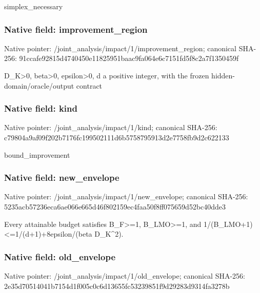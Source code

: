 \documentclass[10pt,a4paper]{article}
\begin{document}
\begingroup\raggedright\sloppy simplex\_\allowbreak{}necessary\par\endgroup

\subsubsection{Native field: improvement\_\allowbreak{}region}
Native pointer: /joint\_\allowbreak{}analysis/impact/1/improvement\_\allowbreak{}region; canonical SHA-256: 91ccafe92815d4740450e11825951baac9fa064e6c7151fd5f8c2a7f1350459f

\begingroup\raggedright\sloppy D\_\allowbreak{}K>0,\allowbreak{} beta>0,\allowbreak{} epsilon>0,\allowbreak{} d a positive integer,\allowbreak{} with the frozen hidden-domain/\allowbreak{}oracle/\allowbreak{}output contract\par\endgroup

\subsubsection{Native field: kind}
Native pointer: /joint\_\allowbreak{}analysis/impact/1/kind; canonical SHA-256: c79804a9af09f202b7176fc199502111d6b5758795913d2e7758fb9d2c622133

\begingroup\raggedright\sloppy bound\_\allowbreak{}improvement\par\endgroup

\subsubsection{Native field: new\_\allowbreak{}envelope}
Native pointer: /joint\_\allowbreak{}analysis/impact/1/new\_\allowbreak{}envelope; canonical SHA-256: 5235acb57236eca6ae066e665d46f802159ec4faa50f8ff075659d52bc40dde3

\begingroup\raggedright\sloppy Every attainable budget satisfies B\_\allowbreak{}F>=\allowbreak{}1,\allowbreak{} B\_\allowbreak{}LMO>=\allowbreak{}1,\allowbreak{} and 1/\allowbreak{}(B\_\allowbreak{}LMO+1)<=\allowbreak{}1/\allowbreak{}(d+1)+8epsilon/\allowbreak{}(beta D\_\allowbreak{}K\textasciicircum{}2).\par\endgroup

\subsubsection{Native field: old\_\allowbreak{}envelope}
Native pointer: /joint\_\allowbreak{}analysis/impact/1/old\_\allowbreak{}envelope; canonical SHA-256: 2e35d70514041b7154d1f005c0c6d13655fc53239851f9d29283d9314fa3278b
\end{document}

